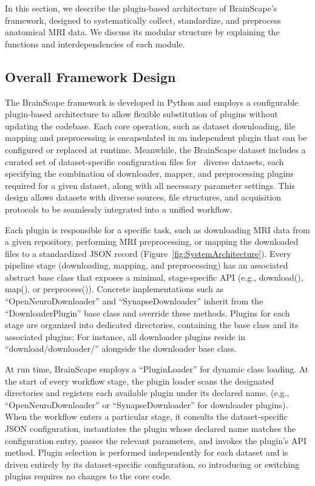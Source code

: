 In this section, we describe the plugin-based architecture of BrainScape's framework, designed to systematically 
collect, standardize, and preprocess anatomical MRI data. We discuss its modular structure by explaining 
the functions and interdependencies of each module.


\subsection{Overall Framework Design}

The BrainScape framework is developed in Python and employs a configurable plugin-based architecture to allow flexible 
substitution of plugins without updating the codebase. 
Each core operation, such as dataset downloading, file mapping and preprocessing is encapsulated in an independent plugin that can be configured or replaced at runtime.
Meanwhile, the BrainScape dataset includes a curated set of dataset-specific configuration files for \NumDatasets\ diverse datasets, 
each specifying the combination of downloader, mapper, and preprocessing plugins required for a given dataset, along with all necessary parameter settings.
This design allows datasets with diverse sources, file structures, and acquisition protocols to be seamlessly integrated into a unified workflow.

Each plugin is responsible for a specific task, such as downloading MRI data from a given repository, 
performing MRI preprocessing, or mapping the downloaded files to a standardized JSON record (Figure~\ref{fig:SystemArchitecture}).
Every pipeline stage (downloading, mapping, and preprocessing) has an associated abstract base class that exposes a minimal, stage-specific API 
(e.g., download(), map(), or preprocess()).
Concrete implementations such as ``OpenNeuroDownloader'' and ``SynapseDownloader'' inherit from the ``DownloaderPlugin'' base class and override these methods. 
Plugins for each stage are organized into dedicated directories, containing the base class and its associated plugins; 
For instance, all downloader plugins reside in ``download/downloader/'' alongside the downloader base class.

At run time, BrainScape employs a ``PluginLoader'' for dynamic class loading.
At the start of every workflow stage, the plugin loader scans the designated directories 
and registers each available plugin under its declared name.
(e.g., ``OpenNeuroDownloader'' or ``SynapseDownloader'' for downloader plugins).
When the workflow enters a particular stage, it consults the dataset-specific JSON configuration, 
instantiates the plugin whose declared name matches the configuration entry, passes the relevant parameters, 
and invokes the plugin's API method. 
Plugin selection is performed independently for each dataset 
and is driven entirely by its dataset-specific configuration, 
so introducing or switching plugins requires no changes to the core code.

